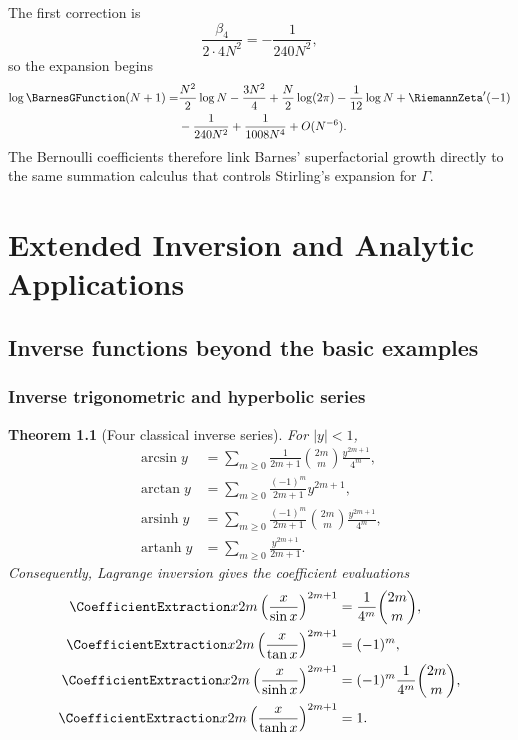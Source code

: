 \documentclass[11pt,a4paper,oneside,openany]{book}
\newtheorem{theorem}{Theorem}[chapter]
\theoremstyle{definition}
\theoremstyle{remark}
\begin{document}
The first correction is
\[
 \frac{\beta_4}{2\cdot4N^2}=-\frac1{240N^2},
\]
so the expansion begins
\begin{align*}
 \log \BarnesGFunction(N+1)=&\frac{N^2}{2}\log N-\frac{3N^2}{4}
 +\frac N2\log(2\pi)-\frac1{12}\log N+\RiemannZeta'(-1)\\
 &-\frac1{240N^2}+\frac1{1008N^4}+O(N^{-6}).
\end{align*}
The Bernoulli coefficients therefore link Barnes' superfactorial growth
directly to the same summation calculus that controls Stirling's expansion for
$\Gamma$.

\part{Extended Inversion and Analytic Applications}
\label{part:extended-inversion}

\chapter{Inverse functions beyond the basic examples}
\label{ch:extended-inverse-functions}

\section{Inverse trigonometric and hyperbolic series}

\begin{theorem}[Four classical inverse series]\label{thm:new-four-inverse-series}
For $|y|<1$,
\begin{align}
 \arcsin y
 &=\sum_{m\ge0}\frac1{2m+1}\binom{2m}{m}
   \frac{y^{2m+1}}{4^m},
 \label{eq:new-arcsin-series}\\
 \arctan y
 &=\sum_{m\ge0}\frac{(-1)^m}{2m+1}y^{2m+1},
 \label{eq:new-arctan-series}\\
 \operatorname{arsinh}y
 &=\sum_{m\ge0}\frac{(-1)^m}{2m+1}\binom{2m}{m}
   \frac{y^{2m+1}}{4^m},
 \label{eq:new-arsinh-series}\\
 \operatorname{artanh}y
 &=\sum_{m\ge0}\frac{y^{2m+1}}{2m+1}.
 \label{eq:new-artanh-series}
\end{align}
Consequently, Lagrange inversion gives the coefficient evaluations
\begin{align}
 \CoefficientExtraction x{2m}\left(\frac{x}{\sin x}\right)^{2m+1}
 &=\frac1{4^m}\binom{2m}{m},
 \label{eq:new-sine-diagonal}\\
 \CoefficientExtraction x{2m}\left(\frac{x}{\tan x}\right)^{2m+1}
 &=(-1)^m,
 \label{eq:new-tangent-diagonal}\\
 \CoefficientExtraction x{2m}\left(\frac{x}{\sinh x}\right)^{2m+1}
 &=(-1)^m\frac1{4^m}\binom{2m}{m},
 \label{eq:new-sinh-diagonal}\\
 \CoefficientExtraction x{2m}\left(\frac{x}{\tanh x}\right)^{2m+1}
 &=1.
 \label{eq:new-tanh-diagonal}
\end{align}
\end{theorem}
\end{document}
